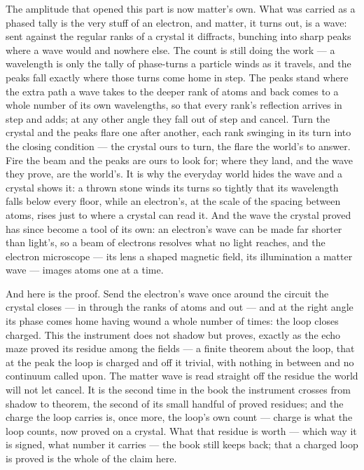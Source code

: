 The amplitude that opened this part is now matter's own. What was carried as a phased tally is the very stuff of
an electron, and matter, it turns out, is a wave: sent against the regular ranks of a crystal it diffracts,
bunching into sharp peaks where a wave would and nowhere else. The count is still doing the work --- a
wavelength is only the tally of phase-turns a particle winds as it travels, and the peaks fall exactly where
those turns come home in step. The peaks stand where the extra path a wave takes to the deeper rank of atoms and
back comes to a whole number of its own wavelengths, so that every rank's reflection arrives in step and adds;
at any other angle they fall out of step and cancel. Turn the crystal and the peaks flare one after another,
each rank swinging in its turn into the closing condition --- the crystal ours to turn, the flare the world's to
answer. Fire the beam and the peaks are ours to look for; where they land, and the wave they prove, are the
world's. It is why the everyday world hides the wave and a crystal shows it: a thrown stone winds its turns so
tightly that its wavelength falls below every floor, while an electron's, at the scale of the spacing between
atoms, rises just to where a crystal can read it. And the wave the crystal proved has since become a tool of its
own: an electron's wave can be made far shorter than light's, so a beam of electrons resolves what no light
reaches, and the electron microscope --- its lens a shaped magnetic field, its illumination a matter wave ---
images atoms one at a time.

And here is the proof. Send the electron's wave once around the circuit the crystal closes --- in through the
ranks of atoms and out --- and at the right angle its phase comes home having wound a whole number of times:
the loop closes charged. This the instrument does not shadow but proves, exactly as the echo maze proved its
residue among the fields --- a finite theorem about the loop, that at the peak the loop is charged and off it
trivial, with nothing in between and no continuum called upon. The matter wave is read straight off the residue
the world will not let cancel. It is the second time in the book the instrument crosses from shadow to theorem,
the second of its small handful of proved residues; and the charge the loop carries is, once more, the loop's
own count --- charge is what the loop counts, now proved on a crystal. What that residue is worth --- which way
it is signed, what number it carries --- the book still keeps back; that a charged loop is proved is the whole
of the claim here.

